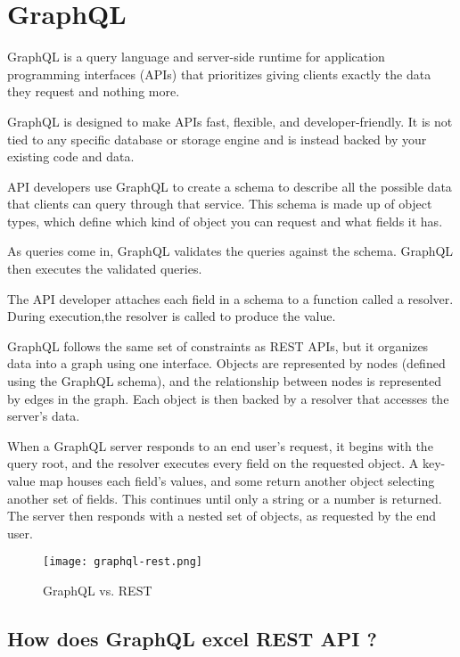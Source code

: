    \section{GraphQL}

   GraphQL is a query language and server-side runtime for application programming interfaces (APIs) 
   that prioritizes giving clients exactly the data they request and nothing more. 

GraphQL is designed to make APIs fast, flexible, and developer-friendly. It is not tied
 to any specific database or storage engine and is instead backed by your existing code and data.

API developers use GraphQL to create a schema to describe all the possible data that clients can query 
through that service. This schema is made up of object types, which define which kind of object you can 
request and what fields it has. 

As queries come in, GraphQL validates the queries against the schema. GraphQL then executes 
the validated queries.

The API developer attaches each field in a schema to a function called a resolver. 
During execution,the resolver is called to produce the value.

GraphQL follows the same set of constraints as REST APIs, but it organizes data into a 
graph using one interface. Objects are represented by nodes (defined using the GraphQL schema), 
and the relationship between nodes is represented by edges in the graph. Each object is then backed
 by a resolver that accesses the server’s data.

When a GraphQL server responds to an end user’s request, it begins with the query root,
and the resolver executes every field on the requested object. A key-value map houses each field’s
values, and some return another object selecting another set of fields. This continues until only a
 string or a number is returned. The server then responds with a nested set of objects, as requested by
  the end user.

  \begin{figure}
      \begin{center}
          \texttt{[image: graphql-rest.png]}
      \end{center}
      \caption{GraphQL vs. REST }
      \label{fig:graphql}
  \end{figure}
  
\subsection{How does GraphQL excel REST API ?}

